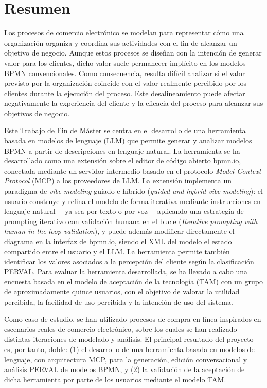 

\chapter*{Resumen}

Los procesos de comercio electrónico se modelan para representar cómo una organización organiza y coordina sus actividades con el fin de alcanzar un objetivo de negocio. Aunque estos procesos se diseñan con la intención de generar valor para los clientes, dicho valor suele permanecer implícito en los modelos BPMN convencionales. Como consecuencia, resulta difícil analizar si el valor previsto por la organización coincide con el valor realmente percibido por los clientes durante la ejecución del proceso. Este desalineamiento puede afectar negativamente la experiencia del cliente y la eficacia del proceso para alcanzar sus objetivos de negocio.

Este Trabajo de Fin de Máster se centra en el desarrollo de una herramienta basada en modelos de lenguaje (LLM) que permite generar y analizar modelos BPMN a partir de descripciones en lenguaje natural. La herramienta se ha desarrollado como una extensión sobre el editor de código abierto bpmn.io, conectada mediante un servidor intermedio basado en el protocolo \textit{Model Context Protocol} (MCP) a los proveedores de LLM. La extensión implementa un paradigma de \textit{vibe modeling} guiado e híbrido (\textit{guided and hybrid vibe modeling}): el usuario construye y refina el modelo de forma iterativa mediante instrucciones en lenguaje natural ---ya sea por texto o por voz--- aplicando una estrategia de prompting iterativo con validación humana en el bucle (\textit{Iterative prompting with human-in-the-loop validation}), y puede además modificar directamente el diagrama en la interfaz de bpmn.io, siendo el XML del modelo el estado compartido entre el usuario y el LLM. La herramienta permite también identificar los valores asociados a la percepción del cliente según la clasificación PERVAL. Para evaluar la herramienta desarrollada, se ha llevado a cabo una encuesta basada en el modelo de aceptación de la tecnología (TAM) con un grupo de aproximadamente quince usuarios, con el objetivo de valorar la utilidad percibida, la facilidad de uso percibida y la intención de uso del sistema.

Como caso de estudio, se han utilizado procesos de compra en línea inspirados en escenarios reales de comercio electrónico, sobre los cuales se han realizado distintas iteraciones de modelado y análisis. El principal resultado del proyecto es, por tanto, doble: (1) el desarrollo de una herramienta basada en modelos de lenguaje, con arquitectura MCP, para la generación, edición conversacional y análisis PERVAL de modelos BPMN, y (2) la validación de la aceptación de dicha herramienta por parte de los usuarios mediante el modelo TAM.

